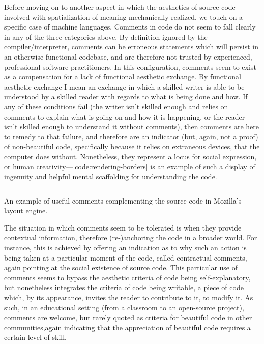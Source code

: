 Before moving on to another aspect in which the aesthetics of source code involved with spatialization of meaning mechanically-realized, we touch on a specific case of machine languages. Comments in code do not seem to fall clearly in any of the three categories above. By definition ignored by the compiler/interpreter, comments can be erroneous statements which will persist in an otherwise functional codebase, and are therefore not trusted by experienced, professional software practitioners. In this configuration, comments seem to exist as a compensation for a lack of functional aesthetic exchange. By functional aesthetic exchange I mean an exchange in which a skilled writer is able to be understood by a skilled reader with regards to what is being done and how. If any of these conditions fail (the writer isn't skilled enough and relies on comments to explain what is going on and how it is happening, or the reader isn't skilled enough to understand it without comments), then comments are here to remedy to that failure, and therefore are an indicator (but, again, not a proof) of non-beautiful code, specifically because it relies on extraneous devices, that the computer does without. Nonetheless, they represent a locus for social expression, or human creativity—\ref{code:rendering-borders} is an example of such a display of ingenuity and helpful mental scaffolding for understanding the code.

\begin{listing}
  \inputminted{c}{./corpus/nsCSSRenderingBorders.cpp}
  \caption{An example of useful comments complementing the source code in Mozilla's layout engine.}
  \label{code:rendering-borders}
\end{listing}

The situation in which comments seem to be tolerated is when they provide contextual information, therefore (re-)anchoring the code in a broader world. For instance, this is achieved by offering an indication as to why such an action is being taken at a particular moment of the code, called contractual comments, again pointing at the social existence of source code. This particular use of comments seems to bypass the aesthetic criteria of code being self-explanatory, but nonetheless integrates the criteria of code being writable, a piece of code which, by its appearance, invites the reader to contribute to it, to modify it. As such, in an educational setting (from a classroom to an open-source project), comments are welcome, but rarely quoted as criteria for beautiful code in other communities,again indicating that the appreciation of beautiful code requires a certain level of skill.

